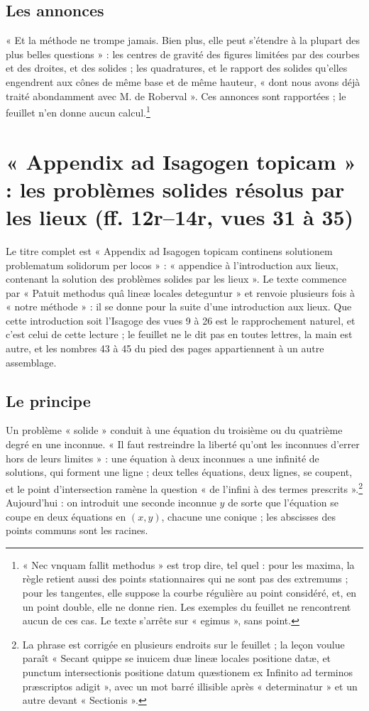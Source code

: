 \documentclass[11pt,a4paper]{article}
\begin{document}
\subsection*{Les annonces}

« Et la méthode ne trompe jamais. Bien plus, elle peut s'étendre à la plupart
des plus belles questions » : les centres de gravité des figures limitées par
des courbes et des droites, et des solides ; les quadratures, et le rapport des
solides qu'elles engendrent aux cônes de même base et de même hauteur, « dont
nous avons déjà traité abondamment avec M. de Roberval ». Ces annonces sont
rapportées ; le feuillet n'en donne aucun calcul.\footnote{« Nec vnquam fallit
methodus » est trop dire, tel quel : pour les maxima, la règle retient aussi
des points stationnaires qui ne sont pas des extremums ; pour les tangentes,
elle suppose la courbe régulière au point considéré, et, en un point double,
elle ne donne rien. Les exemples du feuillet ne rencontrent aucun de ces cas.
Le texte s'arrête sur « egimus », sans point.}

\section*{« Appendix ad Isagogen topicam » : les problèmes solides résolus par les lieux (ff. 12r–14r, vues 31 à 35)}

Le titre complet est « Appendix ad Isagogen topicam continens solutionem
problematum solidorum per locos » : « appendice à l'introduction aux lieux,
contenant la solution des problèmes solides par les lieux ». Le texte commence
par « Patuit methodus quâ lineæ locales deteguntur » et renvoie plusieurs fois à
« notre méthode » : il se donne pour la suite d'une introduction aux lieux.
Que cette introduction soit l'Isagoge des vues 9 à 26 est le rapprochement
naturel, et c'est celui de cette lecture ; le feuillet ne le dit pas en toutes
lettres, la main est autre, et les nombres 43 à 45 du pied des pages
appartiennent à un autre assemblage.

\subsection*{Le principe}

Un problème « solide » conduit à une équation du troisième ou du quatrième
degré en une inconnue. « Il faut restreindre la liberté qu'ont les inconnues
d'errer hors de leurs limites » : une équation à deux inconnues a une infinité
de solutions, qui forment une ligne ; deux telles équations, deux lignes, se
coupent, et le point d'intersection ramène la question « de l'infini à des
termes prescrits ».\footnote{La phrase est corrigée en plusieurs endroits sur le
feuillet ; la leçon voulue paraît « Secant quippe se inuicem duæ lineæ locales
positione datæ, et punctum intersectionis positione datum quæstionem ex
Infinito ad terminos præscriptos adigit », avec un mot barré illisible après
« determinatur » et un autre devant « Sectionis ».} Aujourd'hui : on introduit
une seconde inconnue $y$ de sorte que l'équation se coupe en deux équations en
$(x,y)$, chacune une conique ; les abscisses des points communs sont les
racines.
\end{document}
